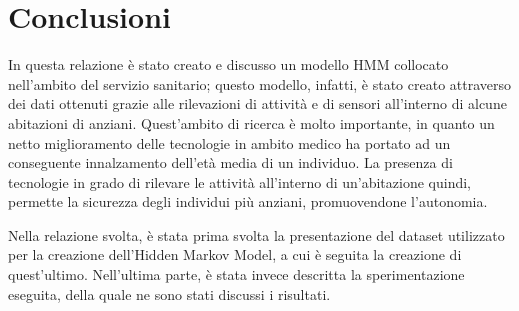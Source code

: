 \documentclass[10pt,a4paper]{article}
\begin{document}
	\clearpage
	\section{Conclusioni}

	In questa relazione è stato creato e discusso un modello HMM collocato nell'ambito del servizio sanitario; questo modello, infatti, è stato creato attraverso dei dati ottenuti grazie alle rilevazioni di attività e di sensori all'interno di alcune abitazioni di anziani. Quest'ambito di ricerca è molto importante, in quanto un netto miglioramento delle tecnologie in ambito medico ha portato ad un conseguente innalzamento dell'età media di un individuo. La presenza di tecnologie in grado di rilevare le attività all'interno di un'abitazione quindi, permette la sicurezza degli individui più anziani, promuovendone l'autonomia.

	Nella relazione svolta, è stata prima svolta la presentazione del dataset utilizzato per la creazione dell'Hidden Markov Model, a cui è seguita la creazione di quest'ultimo.
	Nell'ultima parte, è stata invece descritta la sperimentazione eseguita, della quale ne sono stati discussi i risultati.
\end{document}
